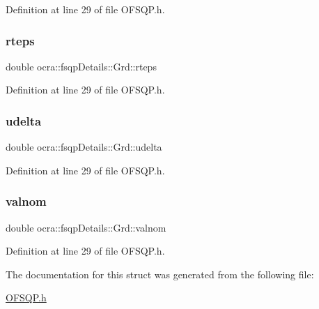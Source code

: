 Definition at line 29 of file O\+F\+S\+Q\+P.\+h.

\hypertarget{structocra_1_1fsqpDetails_1_1Grd_ae0d611f0b701559540811d37c36dba6a}{}\label{structocra_1_1fsqpDetails_1_1Grd_ae0d611f0b701559540811d37c36dba6a} 
\subsubsection{\texorpdfstring{rteps}{rteps}}
{\footnotesize\ttfamily double ocra\+::fsqp\+Details\+::\+Grd\+::rteps}



Definition at line 29 of file O\+F\+S\+Q\+P.\+h.

\hypertarget{structocra_1_1fsqpDetails_1_1Grd_aa1e099590097141f48dc6445cbefd5b1}{}\label{structocra_1_1fsqpDetails_1_1Grd_aa1e099590097141f48dc6445cbefd5b1} 
\subsubsection{\texorpdfstring{udelta}{udelta}}
{\footnotesize\ttfamily double ocra\+::fsqp\+Details\+::\+Grd\+::udelta}



Definition at line 29 of file O\+F\+S\+Q\+P.\+h.

\hypertarget{structocra_1_1fsqpDetails_1_1Grd_ab59ae66f9f4318da4a7b071ff2c9740a}{}\label{structocra_1_1fsqpDetails_1_1Grd_ab59ae66f9f4318da4a7b071ff2c9740a} 
\subsubsection{\texorpdfstring{valnom}{valnom}}
{\footnotesize\ttfamily double ocra\+::fsqp\+Details\+::\+Grd\+::valnom}



Definition at line 29 of file O\+F\+S\+Q\+P.\+h.



The documentation for this struct was generated from the following file\+:\begin{DoxyCompactItemize}
\item 
\hyperlink{OFSQP_8h}{O\+F\+S\+Q\+P.\+h}\end{DoxyCompactItemize}
